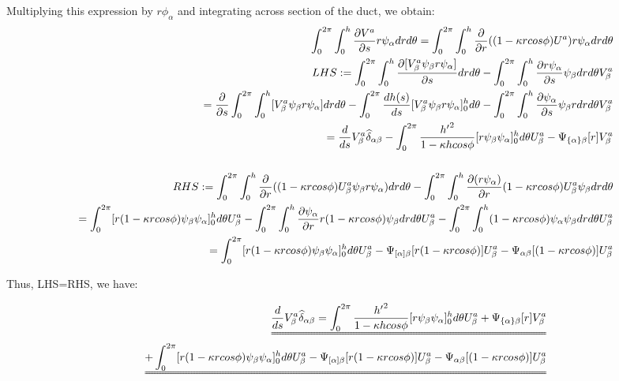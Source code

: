 \documentclass{Note}
\begin{document}
Multiplying this expression by $r\phi_\alpha$ and integrating across section of the duct, we obtain:
\begin{equation}
\begin{aligned}
\int_0^{2\pi}\int_0^h {\partial V^a \over \partial s} r \psi_\alpha dr d\theta=
\int_0^{2\pi}\int_0^h {\partial \over \partial r}((1-\kappa r cos\phi)U^a) r \psi_\alpha dr d\theta\\
LHS:
=\int_0^{2\pi}\int_0^h {\partial [V_\beta^a \psi_\beta r  \psi_\alpha] \over \partial s}  dr d\theta-\int_0^{2\pi}\int_0^h {\partial r  \psi_\alpha  \over \partial s}   \psi_\beta dr d\theta V_\beta^a\\
={\partial \over \partial s}\int_0^{2\pi}\int_0^h [V_\beta^a \psi_\beta r  \psi_\alpha ]  dr d\theta-\int_0^{2\pi}{dh(s)\over ds} [V_\beta^a \psi_\beta r  \psi_\alpha ]_0^h d\theta
-\int_0^{2\pi}\int_0^h {\partial  \psi_\alpha  \over \partial s}   \psi_\beta r  dr d\theta V_\beta^a\\
={d \over d s} V_\beta^a\widehat{\delta }_{\alpha\beta}-\int_0^{2\pi}{{h'}^2\over {1-\kappa h cos\phi}}[r \psi_\beta \psi_\alpha ]_0^h d\theta U_\beta^a -\Psi_{\{\alpha\}\beta}[r]V_\beta^a\\
\\
RHS:=\int_0^{2\pi}\int_0^h {\partial \over \partial r}((1-\kappa r cos\phi)U_\beta^a \psi_\beta r \psi_\alpha) dr d\theta-\int_0^{2\pi}\int_0^h {\partial (  r \psi_\alpha)\over \partial r}(1-\kappa r cos\phi)U_\beta^a  \psi_\beta  dr d\theta\\
=\int_0^{2\pi}[ r (1-\kappa r cos\phi) \psi_\beta \psi_\alpha]_0^h d\theta U_\beta^a
-\int_0^{2\pi}\int_0^h {\partial \psi_\alpha\over \partial r} r(1-\kappa r cos\phi) \psi_\beta  dr d\theta U_\beta^a 
-\int_0^{2\pi}\int_0^h (1-\kappa r cos\phi)  \psi_\alpha \psi_\beta  dr d\theta U_\beta^a\\
=\int_0^{2\pi}[ r (1-\kappa r cos\phi) \psi_\beta \psi_\alpha]_0^h d\theta U_\beta^a
-\Psi_{[\alpha]\beta}[r(1-\kappa r cos\phi)]U_\beta^a
-\Psi_{\alpha\beta}[(1-\kappa r cos\phi)]U_\beta^a\\
\end{aligned}
\end{equation}

Thus, LHS=RHS, we have:

\begin{equation}
\begin{aligned}
\uuline{{d \over ds} V_\beta^a \widehat{\delta }_{\alpha\beta}=\int_0^{2\pi}{{h'}^2\over {1-\kappa h cos\phi}}[r \psi_\beta \psi_\alpha ]_0^h d\theta U_\beta^a +\Psi_{\{\alpha\}\beta}[r]V_\beta^a}\\
\uuline{+\int_0^{2\pi}[ r (1-\kappa r cos\phi) \psi_\beta \psi_\alpha]_0^h d\theta U_\beta^a
-\Psi_{[\alpha]\beta}[r(1-\kappa r cos\phi)]U_\beta^a
-\Psi_{\alpha\beta}[(1-\kappa r cos\phi)]U_\beta^a}\\
\end{aligned}
\end{equation}
\end{document}
